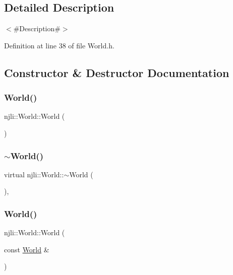 \subsection{Detailed Description}
$<$\#\+Description\#$>$ 

Definition at line 38 of file World.\+h.



\subsection{Constructor \& Destructor Documentation}
\mbox{\label{classnjli_1_1_world_af01e96219aea73e611ba28179b3532ed}} 
\subsubsection{\texorpdfstring{World()}{World()}\hspace{0.1cm}{\footnotesize\ttfamily [1/2]}}
{\footnotesize\ttfamily njli\+::\+World\+::\+World (\begin{DoxyParamCaption}{ }\end{DoxyParamCaption})\hspace{0.3cm}{\ttfamily [private]}}

\mbox{\label{classnjli_1_1_world_aaf74d0ac73e1bf62d7b26bf7fdb6b5cd}} 
\subsubsection{\texorpdfstring{$\sim$\+World()}{~World()}}
{\footnotesize\ttfamily virtual njli\+::\+World\+::$\sim$\+World (\begin{DoxyParamCaption}{ }\end{DoxyParamCaption})\hspace{0.3cm}{\ttfamily [private]}, {\ttfamily [virtual]}}

\mbox{\label{classnjli_1_1_world_abf9c0b24c17244baf76d760e81974cfe}} 
\subsubsection{\texorpdfstring{World()}{World()}\hspace{0.1cm}{\footnotesize\ttfamily [2/2]}}
{\footnotesize\ttfamily njli\+::\+World\+::\+World (\begin{DoxyParamCaption}\item[{const \mbox{\hyperlink{classnjli_1_1_world}{World}} \&}]{ }\end{DoxyParamCaption})\hspace{0.3cm}{\ttfamily [private]}}



